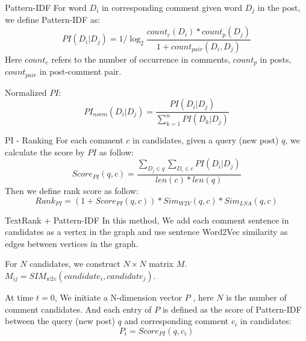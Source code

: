 \documentclass[aspectratio=169]{beamer}
\begin{document}
    \begin{frame}{Pattern-IDF}
      For word $D_i$ in corresponding comment given word $D_j$ in the post, we 
      define Pattern-IDF as:
      \begin{equation}
        PI(D_i|D_j) = 1 / \log_2{\frac{count_c(D_i) * count_p(D_j)}{1+count_{pair}(D_i, D_j)}}
      \end{equation}
      Here $count_c$ refers to the number of occurrence in comments, $count_p$ in posts, $count_{pair}$ in post-comment pair.

      Normalized $PI$:
      \begin{equation}
        PI_{norm}(D_i|D_j) = \frac{PI(D_i|D_j)}{\sum_{k=1}^n{PI(D_k|D_j)}}
      \end{equation}
    \end{frame}

    \begin{frame}{PI - Ranking}
      For each comment $c$ in candidates, given a query (new post) $q$, we 
      calculate the score by $PI$ as follow:
      \begin{equation}
        Score_{PI}(q, c) = \frac{\sum_{D_j \in q}{\sum_{D_i \in c}{PI(D_i|D_j)}}}{len(c) * len(q)}
      \end{equation}
      Then we define rank score as follow:
      \begin{equation}
        Rank_{PI} = (1 + Score_{PI}(q, c)) * Sim_{W2V}(q, c)*Sim_{LSA}(q, c)  
      \end{equation}
    \end{frame}

    \begin{frame}{TextRank + Pattern-IDF}
      In this method, We add each comment sentence in candidates as a vertex in the graph and use sentence Word2Vec similarity as edges between vertices in the graph.

      For $N$ candidates, we construct $ N \times N $ matrix $M$. $M_{ij} = SIM_{w2v}(candidate_i, candidate_j)$. 

      At time $t = 0$, We initiate a N-dimension vector $P$ , here $N$ is the number 
      of comment candidates. And each entry of $P$ is defined as the score of Pattern-IDF between the query (new post) $q$ and corresponding comment $c_i$ in candidates:
      \begin{equation}
        P_i = Score_{PI}(q, c_i)
      \end{equation}
    \end{frame}
\end{document}
